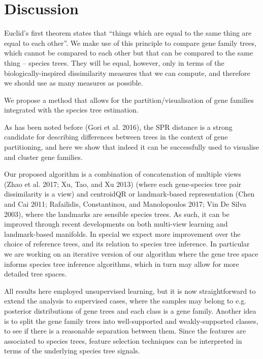 \section{Discussion}
Euclid’s first theorem states that “things which are equal to the same thing are equal to each other”.  We make use of
this principle to compare gene family trees, which cannot be compared to each other but that can be compared to the same
thing – species trees. They will be equal, however, only in terms of the biologically-inspired dissimilarity measures
that we can compute, and therefore we should use as many measures as possible.

We propose a method that allows for the partition/visualisation of gene families integrated with the species tree estimation.

As has been noted before (Gori et al. 2016), the SPR distance is a strong candidate for describing differences between
trees in the context of gene partitioning, and here we show that indeed it can be successfully used to visualise and
cluster gene families.

Our proposed algorithm is a combination of concatenation of multiple views (Zhao et al. 2017; Xu, Tao, and Xu 2013)
(where each gene-species tree pair dissimilarity is a view) and centroidQR or landmark-based representation (Chen and
Cai 2011; Rafailidis, Constantinou, and Manolopoulos 2017; Vin De Silva 2003), where the landmarks are sensible species
trees. As such, it can be improved through recent developments on both multi-view learning and landmark-based manifolds.
In special we expect more improvement over the choice of reference trees, and its relation to species tree inference. In
particular we are working on an iterative version of our algorithm where the gene tree space informs species tree
inference algorithms, which in turn may allow for more detailed tree spaces.

All results here employed unsupervised learning, but it is now straightforward to extend the analysis to supervised
cases, where the samples may belong to e.g. posterior distributions of gene trees and each class is a gene family.
Another idea is to split the gene family trees into well-supported and weakly-supported classes, to see if there is a
reasonable separation between them. Since the features are associated to species trees, feature selection techniques can
be interpreted in terms of the underlying species tree signals.


